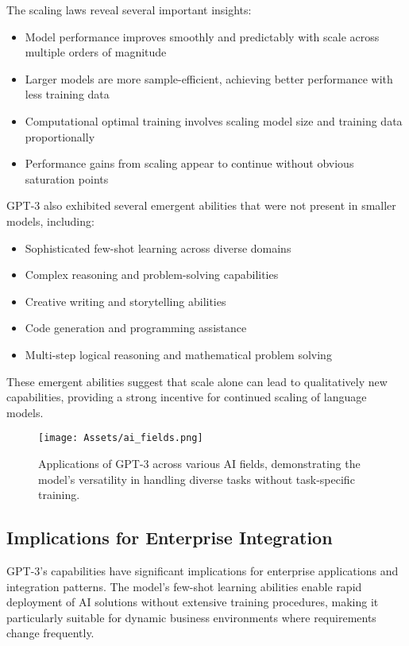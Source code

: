 The scaling laws reveal several important insights:
\begin{itemize}
    \item Model performance improves smoothly and predictably with scale across multiple orders of magnitude
    \item Larger models are more sample-efficient, achieving better performance with less training data
    \item Computational optimal training involves scaling model size and training data proportionally
    \item Performance gains from scaling appear to continue without obvious saturation points
\end{itemize}

GPT-3 also exhibited several emergent abilities that were not present in smaller models, including:
\begin{itemize}
    \item Sophisticated few-shot learning across diverse domains
    \item Complex reasoning and problem-solving capabilities
    \item Creative writing and storytelling abilities
    \item Code generation and programming assistance
    \item Multi-step logical reasoning and mathematical problem solving
\end{itemize}

These emergent abilities suggest that scale alone can lead to qualitatively new capabilities, providing a strong incentive for continued scaling of language models.

\begin{figure}[H]
    \centering
    \texttt{[image: Assets/ai\_fields.png]}
    \caption{Applications of GPT-3 across various AI fields, demonstrating the model's versatility in handling diverse tasks without task-specific training.}
    \label{fig:ai_fields}
\end{figure}

\subsection{Implications for Enterprise Integration}

GPT-3's capabilities have significant implications for enterprise applications and integration patterns. The model's few-shot learning abilities enable rapid deployment of AI solutions without extensive training procedures, making it particularly suitable for dynamic business environments where requirements change frequently.

